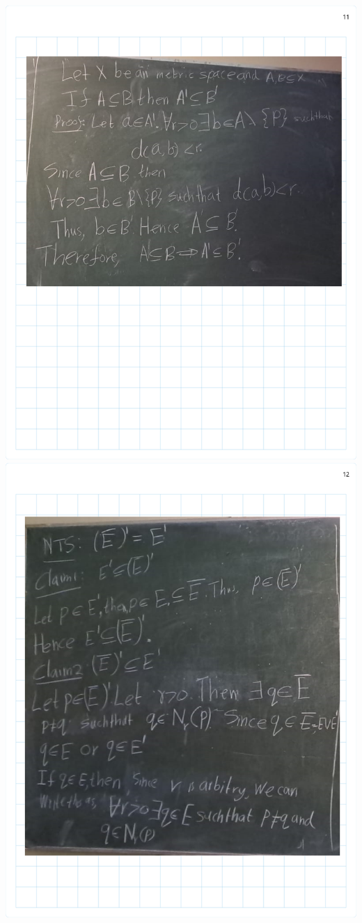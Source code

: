 \documentclass[
]{book}
\theoremstyle{definition}
\theoremstyle{definition}
\theoremstyle{definition}
\theoremstyle{definition}
\theoremstyle{remark}
\begin{document}
\includegraphics{Figures/Ex-2/Rudin Ch2-11.png}
\includegraphics{Figures/Ex-2/Rudin Ch2-12.png}
\end{document}
